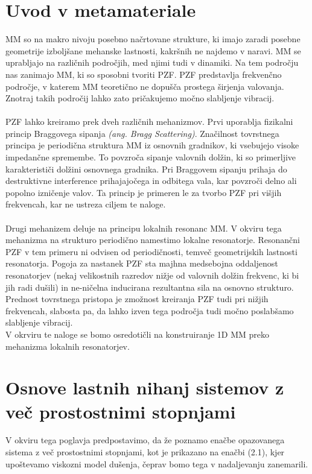 \documentclass[12pt]{report}
\begin{document}
\section{Uvod v metamateriale}
\ac{MM} so na makro nivoju posebno načrtovane strukture, ki imajo zaradi posebne geometrije izboljšane
mehanske lastnosti, kakršnih ne najdemo v naravi. \ac{MM} se uprabljajo na različnih področjih,
med njimi tudi v dinamiki. Na tem področju nas zanimajo \ac{MM}, ki so sposobni tvoriti \ac{PZF}. \ac{PZF} 
predstavlja frekvenčno področje, v katerem \ac{MM} teoretično ne dopušča prostega širjenja valovanja.
Znotraj takih področij lahko zato pričakujemo močno slabljenje vibracij.
\\
\\
\ac{PZF} lahko kreiramo prek dveh različnih mehanizmov. Prvi uporablja fizikalni princip Braggovega sipanja
 \emph{(ang. Bragg Scattering)}. Značilnost tovrstnega principa je periodična struktura \ac{MM} iz osnovnih gradnikov,
 ki vsebujejo visoke impedančne spremembe. To povzroča sipanje valovnih dolžin, ki so primerljive karakterističi dolžini 
 osnovnega gradnika. Pri Braggovem sipanju prihaja do destruktivne interference prihajajočega in odbitega vala, kar povzroči
 delno ali popolno izničenje valov. Ta princip je primeren le za tvorbo \ac{PZF} pri višjih frekvencah, kar ne ustreza
 ciljem te naloge.
 \\
 \\
 Drugi mehanizem deluje na principu lokalnih resonanc \ac{MM}. V okviru tega mehanizma na strukturo periodično namestimo
 lokalne resonatorje. Resonančni \ac{PZF} v tem primeru ni odvisen od periodičnosti, temveč geometrijskih lastnosti resonatorja. 
 Pogoja za nastanek \ac{PZF} sta majhna medsebojna oddaljenost resonatorjev (nekaj velikostnih razredov nižje od valovnih dolžin frekvenc,
 ki bi jih radi dušili) in ne-ničelna inducirana rezultantna sila na osnovno strukturo. Prednost tovrstnega pristopa je zmožnost kreiranja
 \ac{PZF} tudi pri nižjih frekvencah, slabosta pa, da lahko izven tega področja tudi močno poslabšamo slabljenje vibracij. \cite{kosir}
 \\
V okrviru te naloge se bomo osredotičli na konstruiranje 1D \ac{MM} preko mehanizma lokalnih resonatorjev.

\section{Osnove lastnih nihanj sistemov z več prostostnimi stopnjami}
V okviru tega poglavja predpostavimo, da že poznamo enačbe opazovanega sistema z več prostostnimi stopnjami, kot je 
prikazano na enačbi (2.1), kjer upoštevamo viskozni model dušenja, čeprav bomo tega v nadaljevanju zanemarili.
\end{document}
